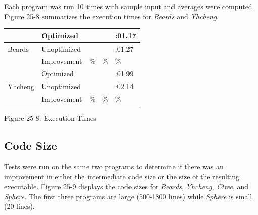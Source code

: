 Each program was run 10 times with sample input and averages were
computed. Figure 25-8 summarizes the execution times for
\textit{Beards} and \textit{Yhcheng}.

\begin{center}
\tabletail{}
\tablelasttail{}
\begin{xtabular}{|m{1.1212599in}|m{1.1212599in}|m{1.1212599in}|m{1.1212599in}|m{1.1212599in}|}
\hline
~
 &
 Optimized &
 &
 &
\raggedleft{}:01.17\\\hline
 Beards &
 Unoptimized &
 &
 &
\raggedleft{}:01.27\\\hline
~
 &
 Improvement &
\% &
\% &
\raggedleft{}\%\\\hline
~
 &
 Optimized &
 &
 &
\raggedleft{}:01.99\\\hline
 Yhcheng &
 Unoptimized &
 &
 &
\raggedleft{}:02.14\\\hline
~
 &
 Improvement &
\% &
\% &
\raggedleft{}\%\\\hline
\end{xtabular}
\end{center}
{\centering{}
Figure 25-8: Execution Times
\par}

\subsection{Code Size}

Tests were run on the same two programs to determine if there was an
improvement in either the intermediate code size or the size of the
resulting executable. Figure 25-9 displays the code sizes for
\textit{Beards}, \textit{Yhcheng}, \textit{Ctree}, and
\textit{Sphere}. The first three programs are large (500-1800 lines)
while \textit{Sphere} is small (20 lines).

